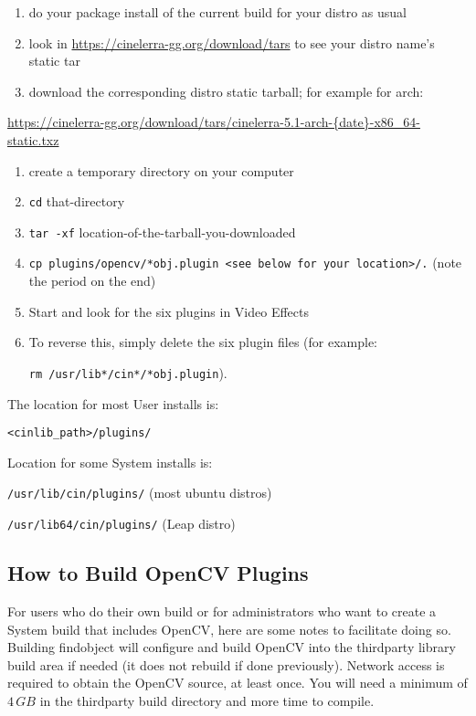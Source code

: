 \begin{enumerate}
    \item do your package install of the current build for your distro as usual
    \item look in {\small \url{https://cinelerra-gg.org/download/tars}} to see your distro name's static tar
    \item download the corresponding distro static tarball;
    for example for arch:
\end{enumerate}

    {\small \url{https://cinelerra-gg.org/download/tars/cinelerra-5.1-arch-{date}-x86_64-static.txz}}

\begin{enumerate}[resume]
    \item create a temporary directory on your computer
    \item \texttt{cd} that-directory
    \item \texttt{tar -xf} location-of-the-tarball-you-downloaded
    \item \texttt{cp plugins/opencv/*obj.plugin <see below for your location>/.} (note the period on the end)
    \item Start \CGG{} and look for the six plugins in Video Effects
    \item To reverse this, simply delete the six plugin files (for example:

    \texttt{rm /usr/lib*/cin*/*obj.plugin}).
\end{enumerate}

The location for most User installs is:

\hspace{4em}\texttt{<cinlib\_path>/plugins/}

Location for some System installs is:

\hspace{4em}\texttt{/usr/lib/cin/plugins/} (most ubuntu distros)

\hspace{4em}\texttt{/usr/lib64/cin/plugins/} (Leap distro)

\subsection{How to Build OpenCV Plugins}%
\label{sub:how_build_opencv_plugins}

For users who do their own build or for administrators who want to create a System build that
includes OpenCV, here are some notes to facilitate doing so.  Building findobject will configure
and build OpenCV into the thirdparty library build area if needed (it does not rebuild if done
previously).  Network access is required to obtain the OpenCV source, at least once. You will
need a minimum of $4\, GB$ in the thirdparty build directory and more time to compile.


